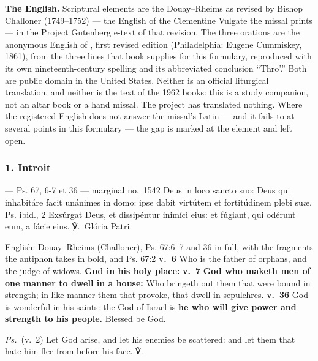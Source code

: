 \textbf{The English.} Scriptural elements are the Douay--Rheims as revised by
Bishop Challoner (1749--1752) --- the English of the Clementine Vulgate the
missal prints --- in the Project Gutenberg e-text of that revision. The three
orations are the anonymous English of , first revised edition
(Philadelphia: Eugene Cummiskey, 1861), from the three lines that book
supplies for this formulary, reproduced with its own nineteenth-century
spelling and its abbreviated conclusion ``Thro'.'' Both are public domain in
the United States. Neither is an official liturgical translation, and neither
is the text of the 1962 books: this is a study companion, not an altar book or
a hand missal. The project has translated nothing. Where the registered
English does not answer the missal's Latin --- and it fails to at several
points in this formulary --- the gap is marked at the element and left open.

\elementguard
\subsubsection*{1. Introit }

\begin{appointedlatin}{ --- Ps. 67, 6-7 et 36 --- marginal no.\ 1542}
Deus in loco sancto suo: Deus qui inhabitáre facit unánimes in domo: ipse
dabit virtútem et fortitúdinem plebi suæ. \textnormal{Ps. ibid., 2} Exsúrgat
Deus, et dissipéntur inimíci eius: et fúgiant, qui odérunt eum, a fácie eius.
℣.~Glória Patri.
\end{appointedlatin}

\begin{namedtranslation}{English: Douay--Rheims (Challoner), Ps. 67:6--7 and 36 in full, with the fragments the antiphon takes in bold, and Ps. 67:2}
\textbf{v.~6} Who is the father of orphans, and the judge of widows.
\textbf{God in his holy place:} \textbf{v.~7} \textbf{God who maketh men of
one manner to dwell in a house:} Who bringeth out them that were bound in
strength; in like manner them that provoke, that dwell in sepulchres.
\textbf{v.~36} God is wonderful in his saints: the God of Israel is
\textbf{he who will give power and strength to his people.} Blessed be God.

\textit{Ps.}~(v.~2) Let God arise, and let his enemies be scattered: and let
them that hate him flee from before his face. ℣.~
\end{namedtranslation}

